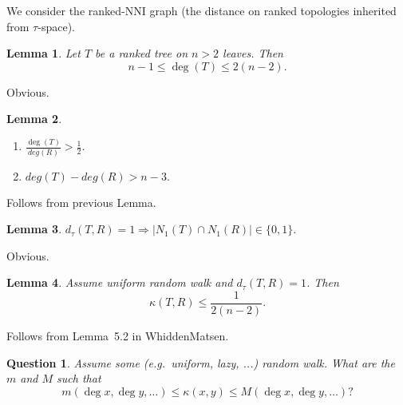 \documentclass[12pt]{article}
\newtheorem{lemma}{Lemma}
\newtheorem{question}{Question}
\begin{document}
We consider the ranked-NNI graph (the distance on ranked topologies inherited from $\tau$-space). 

\begin{lemma}
Let $T$ be a ranked tree on $n>2$ leaves. Then \[n-1\leq \deg(T)\leq2(n-2).\] 
\end{lemma}

\proof
Obvious. 
\endproof

\begin{lemma}
\begin{enumerate}[(1)]
\item $\frac{\deg(T)}{deg(R)}>\frac12.$
\item $deg(T)-deg(R)> n-3.$
\end{enumerate}
\end{lemma}

\proof
Follows from previous Lemma. 
\endproof

\begin{lemma}
$d_{\tau}(T,R) = 1 \Rightarrow |N_1(T)\cap N_1(R)|\in\{0,1\}.$
\end{lemma}

\proof
Obvious.
\endproof

\begin{lemma}
Assume uniform random walk and $d_\tau(T,R) = 1$. Then \[\kappa(T,R) \leq \frac{1}{2(n-2)}.\]
\end{lemma}

\proof
Follows from Lemma~5.2 in WhiddenMatsen. 
\endproof

\begin{question}
Assume some (e.g.\ uniform, lazy, ...) random walk. What are the $m$ and $M$ such that 
\[
m(\deg x,\deg y, \ldots) \leq \kappa(x,y) \leq M(\deg x, \deg y, \ldots)? 
\]
\end{question}
\end{document}
